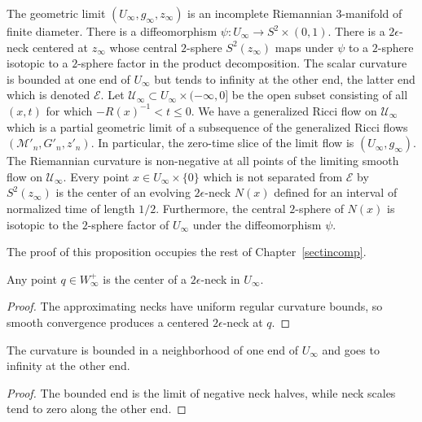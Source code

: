 \begin{proposition}
\label{prop:incomplete-limit-tube-properties}
\label{Uinfty}
The geometric limit $(U_\infty,g_\infty,z_\infty)$ is an incomplete
Riemannian $3$-manifold of finite diameter. There is a
diffeomorphism $\psi\colon U_\infty\to S^2\times (0,1)$. There is a
$2\epsilon$-neck centered at $z_\infty$ whose central $2$-sphere
$S^2(z_\infty)$ maps under $\psi$ to a $2$-sphere isotopic to a
$2$-sphere  factor in the product decomposition. The scalar
curvature is bounded at one end of $U_\infty$ but tends to infinity
at the other end, the latter end  which is denoted ${\mathcal E}$.
Let ${\mathcal U}_\infty\subset U_\infty\times(-\infty,0]$ be the
open subset consisting of all $(x,t)$ for which $-R(x)^{-1}<t\le 0$.
We have a generalized Ricci flow on ${\mathcal U}_\infty$ which is a
partial geometric limit of a subsequence of the generalized Ricci
flows $({\mathcal M}'_n,G'_n,z'_n)$. In particular, the zero-time
slice of the limit flow is $(U_\infty,g_\infty)$. The Riemannian
curvature is non-negative at all points of the limiting smooth flow
on ${\mathcal U}_\infty$. Every point $x\in U_\infty\times\{0\}$
which is not separated from ${\mathcal E}$ by $S^2(z_\infty)$ is the
center of an evolving $2\epsilon$-neck $N(x)$ defined for an
interval of normalized time of length $1/2$. Furthermore, the
central $2$-sphere of $N(x)$ is isotopic to the $2$-sphere factor of
$U_\infty$ under the diffeomorphism $\psi$.
\end{proposition}


The proof of this proposition occupies the rest of
Chapter~\ref{sectincomp}.

\begin{claim}
\label{claim:points-in-Wplus-are-neck-centers}
Any point $q\in W^+_\infty$ is the center of a $2\epsilon$-neck in
$U_\infty$.
\end{claim}
\begin{proof}
\sketch The approximating necks have uniform regular curvature bounds,
so smooth convergence produces a centered $2\epsilon$-neck at $q$.
\end{proof}

\begin{claim}
\label{claim:curvature-bounded-one-end-infinite-other}
The curvature is bounded in a neighborhood of one end of $U_\infty$
and goes to infinity at the other end.
\end{claim}
\begin{proof}
\sketch The bounded end is the limit of negative neck halves, while
neck scales tend to zero along the other end.
\end{proof}


